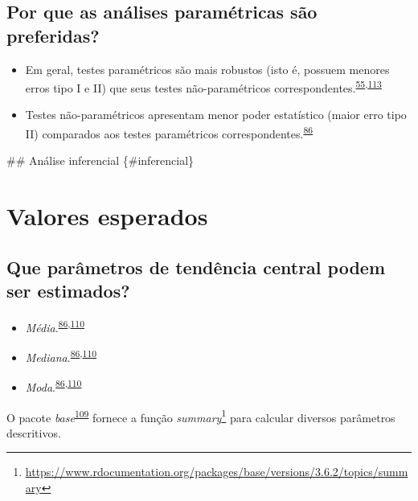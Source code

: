 \documentclass[
  a4paper,
]{book}
\renewcommand{\href}[2]{#2\footnote{\url{#1}}}
\newenvironment{infobox}[1]
  {
  \begin{itemize}
  \renewcommand{\labelitemi}{
    \raisebox{-.7\height}[0pt][0pt]{
      {\setkeys{Gin}{width=3em,keepaspectratio}
        \texttt{[image: \#1]}}
    }
  }
  \setlength{\fboxsep}{1em}
  \begin{blackbox}
  \item
  }
  {
  \end{blackbox}
  \end{itemize}
  }
\begin{document}
\hypertarget{por-que-as-anuxe1lises-paramuxe9tricas-suxe3o-preferidas}{%
\subsection{Por que as análises paramétricas são preferidas?}\label{por-que-as-anuxe1lises-paramuxe9tricas-suxe3o-preferidas}}

\begin{itemize}
\item
  Em geral, testes paramétricos são mais robustos (isto é, possuem menores erros tipo I e II) que seus testes não-paramétricos correspondentes.\textsuperscript{\protect\hyperlink{ref-vetter2017}{55},\protect\hyperlink{ref-greenhalgh1997}{113}}
\item
  Testes não-paramétricos apresentam menor poder estatístico (maior erro tipo II) comparados aos testes paramétricos correspondentes.\textsuperscript{\protect\hyperlink{ref-Ali2016}{86}}
\end{itemize}

\#\# Análise inferencial \{\#inferencial\}

\hypertarget{valores-esperados}{%
\section{Valores esperados}\label{valores-esperados}}

\hypertarget{que-paruxe2metros-de-tenduxeancia-central-podem-ser-estimados}{%
\subsection{Que parâmetros de tendência central podem ser estimados?}\label{que-paruxe2metros-de-tenduxeancia-central-podem-ser-estimados}}

\begin{itemize}
\item
  \emph{Média}.\textsuperscript{\protect\hyperlink{ref-Ali2016}{86},\protect\hyperlink{ref-kanji2006}{110}}
\item
  \emph{Mediana}.\textsuperscript{\protect\hyperlink{ref-Ali2016}{86},\protect\hyperlink{ref-kanji2006}{110}}
\item
  \emph{Moda}.\textsuperscript{\protect\hyperlink{ref-Ali2016}{86},\protect\hyperlink{ref-kanji2006}{110}}
\end{itemize}

\begin{infobox}{images/Rlogo}
O pacote \emph{base}\textsuperscript{\protect\hyperlink{ref-base-6}{109}} fornece a função \href{https://www.rdocumentation.org/packages/base/versions/3.6.2/topics/summary}{\emph{summary}} para calcular diversos parâmetros descritivos.

\end{infobox}
\end{document}

